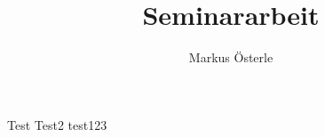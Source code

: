 \documentclass[12pt,a4paper]{report}
\author{Markus Österle}
\title{Seminararbeit}
\begin{document}
\maketitle
\tableofcontents
Test \cite{ta1}
Test2 \cite{ta2}
test123
\printbibliography 
\end{document}
